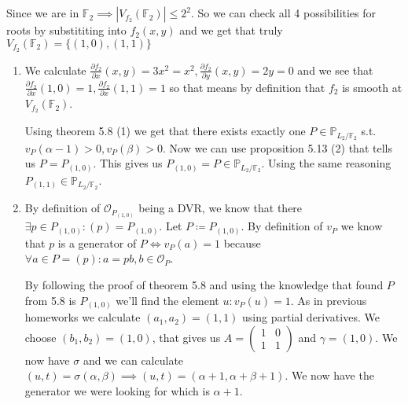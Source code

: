 \documentclass[12pt, a4paper]{article}
\begin{document}
\section{}
Since we are in $\mathbb{F}_2 \implies |V_{f_2}(\mathbb{F}_2)| \leq 2^2$. So we can check all 4 possibilities for roots by substititing into $f_2(x,y)$ and we get that truly $ V_{f_2}(\mathbb{F}_2) = \{(1,0),(1,1)\}$
\begin{enumerate}[label=(\alph*)]
\item We calculate $\frac{\partial f_2}{\partial x} (x,y) = 3x^2=x^2, \frac{\partial f_2}{\partial y} (x,y) = 2y=0$ and we see that $\frac{\partial f_2}{\partial x} (1,0)=1, \frac{\partial f_2}{\partial x} (1,1) = 1$ so that means by definition that $f_2$ is smooth at $ V_{f_2}(\mathbb{F}_2)$.

Using theorem 5.8 (1) we get that there exists exactly one $P \in \mathbb{P}_{L_2/\mathbb{F}_2}$ s.t. $v_P(\alpha-1)>0,v_P(\beta)>0$. Now we can use proposition 5.13 (2) that tells us $P=P_{(1,0)}$. This gives us $P_{(1,0)}=P \in \mathbb{P}_{L_2/\mathbb{F}_2}$. Using the same reasoning $P_{(1,1)} \in \mathbb{P}_{L_2/\mathbb{F}_2}$.

\item By definition of $\mathcal{O}_{P_{(1,0)}}$ being a DVR, we know that there $\exists p \in P_{(1,0)}: (p)=P_{(1,0)}$. Let $P \coloneqq P_{(1,0)}$. By definition of $v_P$ we know that $p$ is a generator of $P \iff v_P(a) = 1$ because $\forall a \in P = (p): a = pb, b \in \mathcal{O}_{P}$.

By following the proof of theorem 5.8 and using the knowledge that found $P$ from 5.8 is $P_{(1,0)}$ we'll find the element $u: v_P(u)=1$. As in previous homeworks we calculate $(a_1,a_2)=(1,1)$ using partial derivatives. We choose $(b_1,b_2)=(1,0)$, that gives us $A = \begin{pmatrix}
1 & 0\\
1 & 1
\end{pmatrix}$ and $\gamma = (1,0)$. We now have $\sigma$ and we can calculate $(u,t)=\sigma(\alpha, \beta) \implies (u,t)=(\alpha+1, \alpha+\beta+1)$. We now have the generator we were looking for which is $\alpha+1$.
\end{enumerate}
\end{document}
